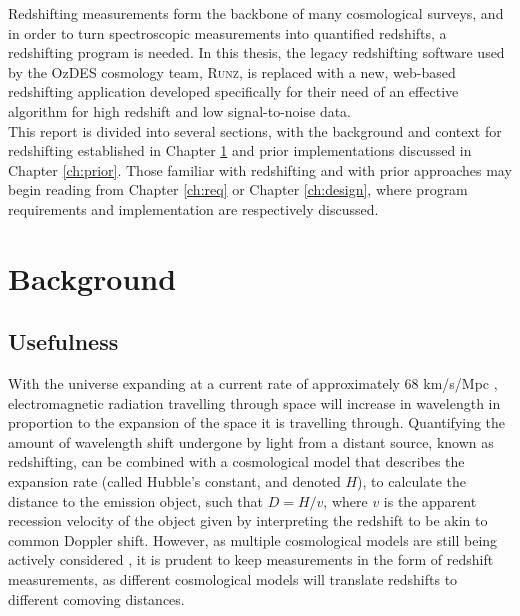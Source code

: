 \documentclass[titlesmallcaps, examinerscopy, copyrightpage]{uqthesis}
\newcommand{\runz}{\textsc{Runz}}
\begin{document}
Redshifting measurements form the backbone of many cosmological surveys, and in order to turn spectroscopic measurements into quantified redshifts, a redshifting program is needed. In this thesis, the legacy redshifting software used by the OzDES cosmology team, \runz{}, is replaced with a new, web-based redshifting application developed specifically for their need of an effective algorithm for high redshift and low signal-to-noise data.\\

This report is divided into several sections, with the background and context for redshifting established in Chapter \ref{ch:back} and prior implementations discussed in Chapter \ref{ch:prior}. Those familiar with redshifting and with prior approaches may begin reading from Chapter \ref{ch:req} or Chapter \ref{ch:design}, where program requirements and implementation are respectively discussed.












\chapter{Background}
\label{ch:back}

\section{Usefulness}

With the universe expanding at a current rate of approximately 68 km/s/Mpc \cite{ade2013planck}, electromagnetic radiation travelling through space will increase in wavelength in proportion to the expansion of the space it is travelling through. Quantifying the amount of wavelength shift undergone by light from a distant source, known as redshifting, can be combined with a cosmological model that describes the expansion rate (called Hubble's constant, and denoted $H$), to calculate the distance to the emission object, such that $D = H/v$, where $v$ is the apparent recession velocity of the object given by interpreting the redshift to be akin to common Doppler shift. However, as multiple cosmological models are still being actively considered \cite{davis2007scrutinizing}, it is prudent to keep measurements in the form of redshift measurements, as different cosmological models will translate redshifts to different comoving distances.\\
\end{document}
